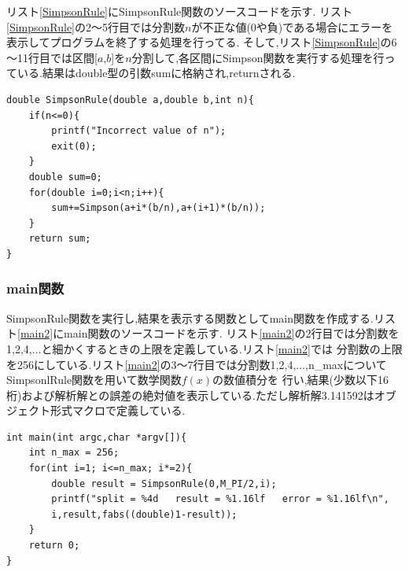 \documentclass[dvipdfmx]{jarticle}
\begin{document}
      リスト\ref{SimpsonRule}にSimpsonRule関数のソースコードを示す.
      リスト\ref{SimpsonRule}の2～5行目では分割数$n$が不正な値(0や負)である場合にエラーを表示してプログラムを終了する処理を行ってる.
      そして,リスト\ref{SimpsonRule}の6～11行目では区間[$a$,$b$]を$n$分割して,各区間にSimpson関数を実行する処理を行っている.結果はdouble型の引数sumに格納され,returnされる.
      \begin{lstlisting}[basicstyle=\ttfamily\footnotesize, frame=single,label=SimpsonRule,caption=SimpsonRule関数]
double SimpsonRule(double a,double b,int n){
    if(n<=0){
        printf("Incorrect value of n");
        exit(0);
    }
    double sum=0;
    for(double i=0;i<n;i++){
        sum+=Simpson(a+i*(b/n),a+(i+1)*(b/n));
    }
    return sum;
}
            \end{lstlisting}

    \subsubsection{main関数}
    SimpsonRule関数を実行し,結果を表示する関数としてmain関数を作成する.リスト\ref{main2}にmain関数のソースコードを示す.
    リスト\ref{main2}の2行目では分割数を1,2,4,$\dots$と細かくするときの上限を定義している.リスト\ref{main2}では
    分割数の上限を256にしている.リスト\ref{main2}の3～7行目では分割数1,2,4,$\dots$,n\_maxについてSimpsonlRule関数を用いて数学関数$f(x)$の数値積分を
    行い,結果(少数以下16桁)および解析解との誤差の絶対値を表示している.ただし解析解3.141592はオブジェクト形式マクロで定義している.
      \begin{lstlisting}[basicstyle=\ttfamily\footnotesize, frame=single,label=main2,caption=main2関数]
int main(int argc,char *argv[]){
    int n_max = 256;
    for(int i=1; i<=n_max; i*=2){
        double result = SimpsonRule(0,M_PI/2,i);
        printf("split = %4d   result = %1.16lf   error = %1.16lf\n",
        i,result,fabs((double)1-result));
    }
    return 0;
}
    \end{lstlisting}
\end{document}
